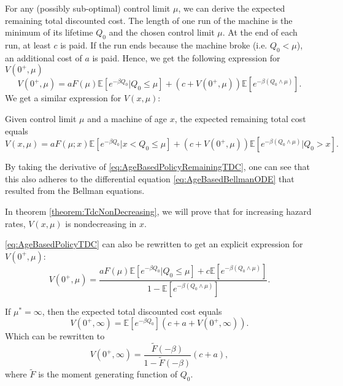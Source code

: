 For any (possibly sub-optimal) control limit $\mu$, we can derive the expected remaining total discounted cost.
The length of one run of the machine is the minimum of its lifetime $Q_0$ and the chosen control limit $\mu$.
At the end of each run, at least $c$ is paid.
If the run ends because the machine broke (i.e. $Q_0<\mu$), an additional cost of $a$ is paid.
Hence, we get the following expression for $V(0^+,\mu)$
\begin{equation}\label{eq:AgeBasedPolicyTDC}
V(0^+,\mu)=aF(\mu)\mathbb{E}[e^{-\beta Q_0}|Q_0\leq \mu]+(c+V(0^+,\mu))\mathbb{E}[e^{-\beta(Q_0\wedge\mu)}].
\end{equation}
We get a similar expression for $V(x,\mu)$:

\begin{theorem}
	Given control limit $\mu$ and a machine of age $x$, the expected remaining total cost equals 
	\begin{equation}\label{eq:AgeBasedPolicyRemainingTDC}
	V(x,\mu)=aF(\mu;x)\mathbb{E}[e^{-\beta Q_0}|x<Q_0\leq \mu]+(c+V(0^+,\mu))\mathbb{E}[e^{-\beta(Q_0\wedge\mu)}|Q_0>x].
	\end{equation}
\end{theorem}

\begin{remark}
	By taking the derivative of \eqref{eq:AgeBasedPolicyRemainingTDC}, one can see that this also adheres to the differential equation \eqref{eq:AgeBasedBellmanODE} that resulted from the Bellman equations.
\end{remark}

\begin{remark}
	In theorem \ref{theorem:TdcNonDecreasing}, we will prove that for increasing hazard rates, $V(x,\mu)$ is nondecreasing in $x$.
\end{remark}

\begin{remark}
	\eqref{eq:AgeBasedPolicyTDC} can also be rewritten to get an explicit expression for $V(0^+,\mu)$:
	\begin{equation}\label{eq:AgeBasedOptimalTDC}
	V(0^+,\mu)=\frac{aF(\mu)\mathbb{E}[e^{-\beta Q_0}|Q_0\leq \mu]+c\mathbb{E}[e^{-\beta(Q_0\wedge\mu)}]}{1-\mathbb{E}[e^{-\beta (Q_0\wedge\mu)}]}.
	\end{equation}
\end{remark}

\begin{remark}
	If $\mu^*=\infty$, then the expected total discounted cost equals
	\[V(0^+,\infty)=\mathbb{E}[e^{-\beta Q_0}](c+a+V(0^+,\infty)).\]
	Which can be rewritten to
	\[V(0^+,\infty)=\frac{\tilde{F}(-\beta)}{1-\tilde{F}(-\beta)}(c+a),\]
	where $\tilde{F}$ is the moment generating function of $Q_0$.
\end{remark}

